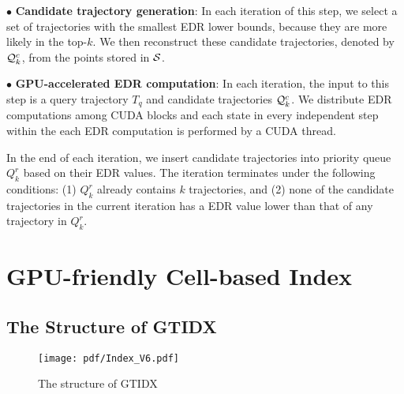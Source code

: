 \documentclass[10pt,conference,letterpaper]{IEEEtran}
\newcommand{\idxname}{GTIDX\xspace }
\newcommand{\simcand}{{{\cal Q}_k^c}\xspace}
\newcommand{\trajtable}{{\cal S}\xspace}
\begin{document}
\vspace{0.1cm}$\bullet$ {\bf Candidate trajectory generation}:
In each iteration of this step, we select a set of trajectories with the smallest EDR lower bounds, because they are more likely in the top-$k$. We then reconstruct these candidate trajectories, denoted by $\simcand$, from the points stored in $\trajtable$.

\vspace{0.1cm}$\bullet$ {\bf GPU-accelerated EDR computation}:
In each iteration, the input to this step is a query trajectory $T_q$ and candidate trajectories $\simcand$. We distribute EDR computations among CUDA blocks and each state in every independent step within the each EDR computation is performed by a CUDA thread.

In the end of each iteration, we insert candidate trajectories into priority queue $Q_{k}^r$ based on their EDR values. The iteration terminates under the following conditions: (1) $Q_{k}^r$ already contains $k$ trajectories, and (2) none of the candidate trajectories in the current iteration has a EDR value lower than that of any trajectory in $Q_{k}^r$.




\section{GPU-friendly Cell-based Index}\label{sec:index}


\subsection{The Structure of \idxname}

\begin{figure}[t]
	\centering
	\texttt{[image: pdf/Index\_V6.pdf]}
	\vspace{-.2in}
	\caption{The structure of \idxname \label{fig:Index}}
	\vspace{-.1in}
\end{figure}

\end{document}
